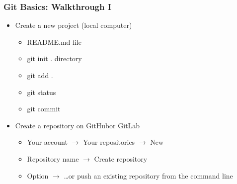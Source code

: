\documentclass[t]{beamer}
\begin{document}
\begin{frame}[fragile]
    \frametitle{Git Basics: Walkthrough I}
    \begin{itemize}
        \item Create a new project (local computer)
            \begin{itemize}
                \item README.md file
                \item git init . directory
                \item git add .
                \item git status 
                \item git commit 
            \end{itemize}
        \item Create a repository on GitHub\footnotemark or GitLab
            \begin{itemize}
                \item Your account $\rightarrow$ Your repositories $\rightarrow$ New 
                \item Repository name $\rightarrow$ Create repository
                \item Option $\rightarrow$ …or push an existing repository from the command line
            \end{itemize}
            \end{itemize}
\end{frame}
\end{document}
